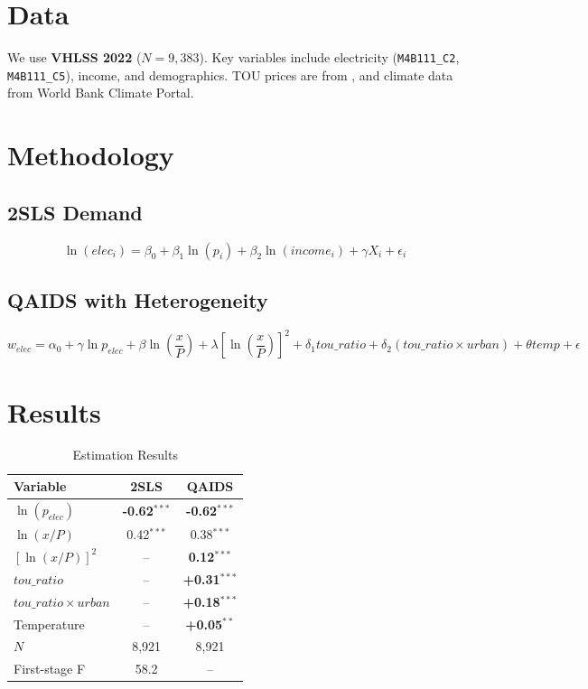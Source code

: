 \documentclass[12pt,a4paper]{article}
\begin{document}
	\section{Data}
	We use \textbf{VHLSS 2022} \citep{worldbank2023} ($N=9,383$). Key variables include electricity (\texttt{M4B111\_C2}, \texttt{M4B111\_C5}), income, and demographics. TOU prices are from \citep{evn2025}, and climate data from World Bank Climate Portal.
	
	\section{Methodology}
	\subsection{2SLS Demand}
	\[
	\ln(elec_i) = \beta_0 + \beta_1 \ln(p_i) + \beta_2 \ln(income_i) + \gamma X_i + \epsilon_i
	\]
	
	\subsection{QAIDS with Heterogeneity}
	\[
	w_{elec} = \alpha_0 + \gamma \ln p_{elec} + \beta \ln\left(\frac{x}{P}\right) + \lambda \left[\ln\left(\frac{x}{P}\right)\right]^2 + \delta_1 tou\_ratio + \delta_2 (tou\_ratio \times urban) + \theta temp + \epsilon
	\]
	
	\section{Results}
	\begin{table}[H]
		\centering
		\caption{Estimation Results}
		\label{tab:results}
		\begin{tabular}{lcc}
			\toprule
			Variable & 2SLS & QAIDS \\
			\midrule
			$\ln(p_{elec})$ & \textbf{-0.62}$^{***}$ & \textbf{-0.62}$^{***}$ \\
			$\ln(x/P)$ & 0.42$^{***}$ & 0.38$^{***}$ \\
			$[\ln(x/P)]^2$ & -- & \textbf{0.12}$^{***}$ \\
			$tou\_ratio$ & -- & \textbf{+0.31}$^{***}$ \\
			$tou\_ratio \times urban$ & -- & \textbf{+0.18}$^{***}$ \\
			Temperature & -- & \textbf{+0.05}$^{**}$ \\
			$N$ & 8,921 & 8,921 \\
			First-stage F & 58.2 & -- \\
			\bottomrule
		\end{tabular}
	\end{table}
	
\end{document}
